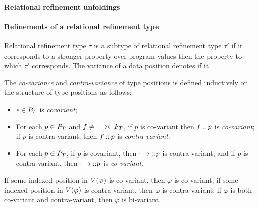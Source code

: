 \paragraph{Relational refinement unfoldings}
%

\paragraph{Refinements of a relational refinement type}
Relational refinement type $\tau$ is a subtype of relational
refinement type $\tau'$ if it corresponds to a stronger property over
program values then the property to which $\tau'$ corresponds.
The variance of a data position denotes if it
%
%
\begin{defn}
  \label{defn:variance}
  The \emph{co-variance} and \emph{contra-variance} of type positions
  is defined inductively on the structure of type positions as
  follows:
  \begin{itemize}
  \item %
    $\epsilon \in P_T$ is \emph{covariant};
  \item %
    For each $p \in P_T$ and
    $f \not= \cdot \to \in F_T$, if $p$ is co-variant then
    $f \mathbin{::} p$ is \emph{co-variant};
    if $p$ is contra-variant, then $f \mathbin{::} p$ is
    \emph{contra-variant}.
  \item %
    For each $p \in P_T$, if $p$ is covariant, then
    $\cdot \to \mathbin{::} p$ is contra-variant, and if $p$ is
    contra-variant, then $\cdot \to \mathbin{::} p$ is \emph{co-variant}.
  \end{itemize}
\end{defn}

If some indexed position in $V(\varphi)$ is co-variant, then
$\varphi$ is co-variant;
%
if some indexed position in $V(\varphi)$ is contra-variant, then
$\varphi$ is contra-variant;
%
if $\varphi$ is both co-variant and contra-variant, then $\varphi$ is
bi-variant.

